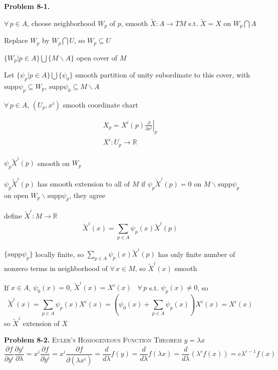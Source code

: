 \documentclass[11pt]{amsart}
\theoremstyle{definition}
\newcommand{\problemhead}[1]{\medskip\noindent\textbf{Problem #1.} }
\begin{document}
\problemhead{8-1}

$\forall \, p \in A$, choose neighborhood $W_p$ of $p$, smooth $\widetilde{X}:A \to TM$ s.t. $\widetilde{X} = X$ on $W_p \bigcap A$

Replace $W_p$ by $W_p \bigcap U$, so $W_p \subseteq U$

$\lbrace W_p | p \in A \rbrace \bigcup \lbrace M \backslash A \rbrace$ open cover of $M$

Let $\lbrace \psi_p | p \in A \rbrace \bigcup \lbrace \psi_0 \rbrace$ smooth partition of unity subordinate to this cover, with $\text{supp}{\psi_p} \subseteq W_p$, $\text{supp}{\psi_0} \subseteq M \backslash A$

$\forall \, p \in A$, $(U_p,x^i)$ smooth coordinate chart

\[
\begin{gathered}
  X_p = \left. X^i(p) \frac{ \partial }{ \partial x^i } \right|_p \\
  X^i: U_p \to \mathbb{R}
\end{gathered}
\]

$\psi_p \widetilde{X}^i(p)$ smooth on $W_p$

$\psi_p\widetilde{X}^i(p)$ has smooth extension to all of $M$ if $\psi_p \widetilde{X}^i(p) =0$ on $M\backslash \text{supp}{\psi_p}$ \\

on open $W_p \backslash \text{supp}{ \psi_p}$, they agree

define $\widetilde{X}^i:M \to \mathbb{R}$
\[
\widetilde{X}^i(x) = \sum_{p \in A} \psi_p(x) \widetilde{X}^i(p)
\]

$\lbrace \text{supp}{\psi_p} \rbrace$ locally finite, so $\sum_{p\in A} \psi_p(x) \widetilde{X}^i(p)$ has only finite number of nonzero terms in neighborhood of $\forall \, x \in M$, so $\widetilde{X}^i(x)$ smooth

If $x\in A$, $\psi_0(x) = 0$, $\widetilde{X}^i(x) = X^i(x)$ \quad \, $\forall \, p $ s.t. $\psi_p(x) \neq 0$, so
\[
\widetilde{X}^i(x) = \sum_{p\in A} \psi_p(x) X^i(x) = (\psi_0(x) + \sum_{p\in A} \psi_p(x)) X^i(x) = X^i(x)
\]
so $\widetilde{X}^i$ extension of $X$


\hrulefill

\problemhead{8-2} \textsc{Euler's Homogeneous Function Theorem}
$y = \lambda x$
\[
\frac{ \partial f}{ \partial y^i } \frac{ \partial y^i}{ \partial \lambda} = x^i \frac{ \partial f}{ \partial y^i} = x^i \frac{ \partial f}{ \partial ( \lambda x^i)} = \frac{d}{d\lambda} f(y) = \frac{d}{d\lambda} f(\lambda x) = \frac{d}{d\lambda} ( \lambda^c f(x)) = c \lambda^{c-1} f(x)
\]
\end{document}
